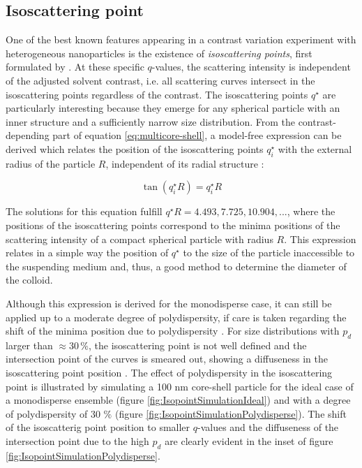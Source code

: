 \subsection{Isoscattering point}
\label{sec:isopoint_theory}
One of the best known features appearing in a contrast variation experiment with heterogeneous nanoparticles is the existence of \emph{isoscattering points}, first formulated by \cite{kawaguchi_x-ray_1983-1}. At these specific \( q\)-values, the scattering intensity is independent of the adjusted solvent contrast, i.e. all scattering curves intersect in the isoscattering points regardless of the contrast. The isoscattering points \(q^{\star}\) are particularly interesting because they emerge for any spherical particle with an inner structure and a sufficiently narrow size distribution. From the contrast-depending part of equation \eqref{eq:multicore-shell}, a model-free expression can be derived which relates the position of the isoscattering points \(q^{\star}_i\) with the external radius of the particle \( R \), independent of its radial structure \citep{kawaguchi_x-ray_1983-1,kawaguchi_isoscattering_1992}:

\begin{equation}
        \label{eq:isoscattering}
        \tan(q^{\star}_iR)=q^{\star}_iR
\end{equation}

The solutions for this equation fulfill $q^{\star} R =4.493, 7.725, 10.904, ...$, where the positions of the isoscattering points correspond to the minima positions of the scattering intensity of a compact spherical particle with radius \( R \). This expression relates in a simple way the position of $q^{\star}$ to the size of the particle inaccessible to the suspending medium and, thus, a good method to determine the diameter of the colloid.

Although this expression is derived for the monodisperse case, it can still be applied up to a moderate degree of polydispersity, if care is taken regarding the shift of the minima position due to polydispersity \citep{beurten_polydispersity_1981}. For size distributions with \( p_d\) larger than \( \approx 30\,\% \), the isoscattering point is not well defined and the intersection point of the curves is smeared out, showing a diffuseness in the isoscattering point position \citep{kawaguchi_isoscattering_1992}. The effect of polydispersity in the isoscattering point is illustrated by simulating a 100 nm core-shell particle for the ideal case of a monodisperse ensemble (figure \ref{fig:IsopointSimulationIdeal}) and with a degree of polydispersity of 30 $\%$ (figure \ref{fig:IsopointSimulationPolydisperse}). The shift of the isoscatterig point position to smaller $q$-values and the diffuseness of the intersection point due to the high $p_d$ are clearly evident in the inset of figure \ref{fig:IsopointSimulationPolydisperse}.


